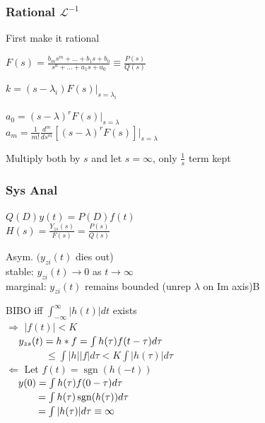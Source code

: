 \documentclass[4pt]{article}
\theoremstyle{definition}
\theoremstyle{definition}
\newcommand{\ra}{\rightarrow}
\DeclareMathOperator{\sgn}{sgn}
\begin{document}
\begin{landscape}
\begin{multicols}{3}
\subsubsection*{Rational $\mathcal L^{-1}$}
    First make it rational      %

    \(F(s) = \frac{b_ms^m + ... + b_1s + b_0}{s^n + ... + a_1s + a_0} \equiv \frac{P(s)}{Q(s)}\)

    \(k = (s-\lambda_i) F(s) | _{s = \lambda_i}\)

    \(a_0 = (s-\lambda)^r F(s)|_{s=\lambda}\)\\
    \(a_m = \frac{1}{m!} \frac{d^m}{ds^m}[(s-\lambda)^r F(s)] |_{s = \lambda}\)

    Multiply both by $s$ and let $s=\infty$, only $\frac{1}{s}$ term kept 
\newpage
\subsubsection*{Sys Anal}
    \(Q(D) y(t) = P(D) f(t)\)\\
    $H(s) = \frac{Y_{zs}(s)}{F(s)} = \frac{P(s)}{Q(s)}$  %

    Asym. $(y_{zi} (t)$ dies out)\\         %
    stable: $y_{zi}(t) \ra 0$ as $t\ra \infty$\\
    marginal: $y_{zi}(t)$ remains bounded (unrep $\lambda$ on Im axis)B

    BIBO iff \(\int_{-\infty}^{\infty} |h(t)| dt\) exists\\ %
    $\Rightarrow$ $|f(t)| < K$\\                       %
    \(\hspace{1.25em}y_{zs}(t) = h * f= \int h(\tau) f(t-\tau) d\tau\)\\
    \(\hspace{4em} \leq \int |h||f| d\tau < K \int |h(\tau)| d\tau\)\\
    $\Leftarrow$ Let $f(t) = \sgn(h(-t))$\\                %
    \(\hspace{1.25em} y(0) = \int h(\tau) f(0-\tau) d\tau\)\\
    \(\hspace{3.25em} = \int h(\tau) \sgn(h(\tau)) d\tau\)\\
    \(\hspace{3.25em} = \int |h(\tau)| d\tau \equiv \infty\)


\end{multicols}
\end{landscape}
\end{document}
